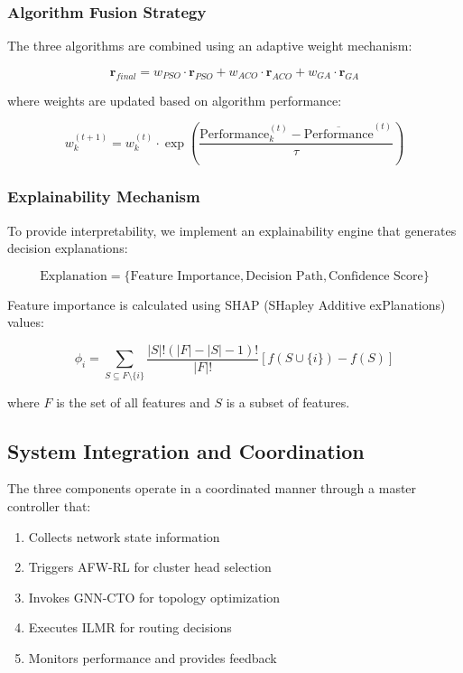 \documentclass[conference]{IEEEtran}
\begin{document}
\subsubsection{Algorithm Fusion Strategy}

The three algorithms are combined using an adaptive weight mechanism:

\begin{equation}
\mathbf{r}_{final} = w_{PSO} \cdot \mathbf{r}_{PSO} + w_{ACO} \cdot \mathbf{r}_{ACO} + w_{GA} \cdot \mathbf{r}_{GA}
\end{equation}

where weights are updated based on algorithm performance:

\begin{equation}
w_k^{(t+1)} = w_k^{(t)} \cdot \exp\left(\frac{\text{Performance}_k^{(t)} - \overline{\text{Performance}}^{(t)}}{\tau}\right)
\end{equation}

\subsubsection{Explainability Mechanism}

To provide interpretability, we implement an explainability engine that generates decision explanations:

\begin{equation}
\text{Explanation} = \{\text{Feature Importance}, \text{Decision Path}, \text{Confidence Score}\}
\end{equation}

Feature importance is calculated using SHAP (SHapley Additive exPlanations) values:

\begin{equation}
\phi_i = \sum_{S \subseteq F \setminus \{i\}} \frac{|S|!(|F|-|S|-1)!}{|F|!} [f(S \cup \{i\}) - f(S)]
\end{equation}

where $F$ is the set of all features and $S$ is a subset of features.

\subsection{System Integration and Coordination}

The three components operate in a coordinated manner through a master controller that:

\begin{enumerate}
    \item Collects network state information
    \item Triggers AFW-RL for cluster head selection
    \item Invokes GNN-CTO for topology optimization
    \item Executes ILMR for routing decisions
    \item Monitors performance and provides feedback
\end{enumerate}
\end{document}
